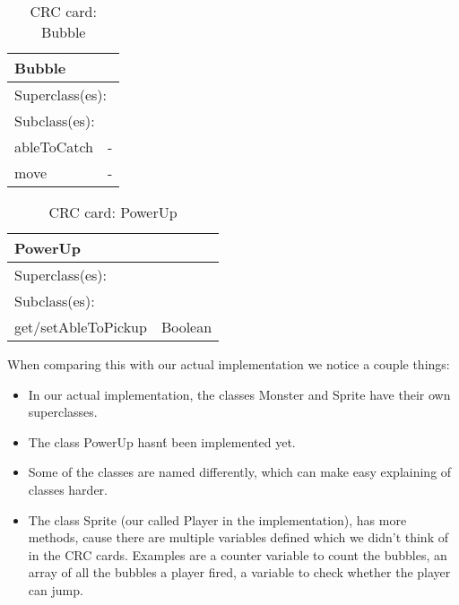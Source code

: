 \begin{table}[]
\centering
\label{crc_bubble}
\begin{tabular}{|l|l|}
\hline
\multicolumn{2}{|l|}{Bubble} \\ \hline
\multicolumn{2}{|l|}{Superclass(es):} \\ \hline
\multicolumn{2}{|l|}{Subclass(es):} \\ \hline
ableToCatch           & - \\ \hline
move           & -\\ \hline
\end{tabular}
\caption{CRC card: Bubble}
\end{table}

\begin{table}[]
\centering
\label{crc_powerup}
\begin{tabular}{|l|l|}
\hline
\multicolumn{2}{|l|}{PowerUp} \\ \hline
\multicolumn{2}{|l|}{Superclass(es):} \\ \hline
\multicolumn{2}{|l|}{Subclass(es):} \\ \hline
get/setAbleToPickup           & Boolean \\ \hline
\end{tabular}
\caption{CRC card: PowerUp}
\end{table}

When comparing this with our actual implementation we notice a couple things:
\begin{itemize}
\item In our actual implementation, the classes Monster and Sprite have their own superclasses.
\item The class PowerUp hasn\'t been implemented yet. 
\item Some of the classes are named differently, which can make easy explaining of classes harder. 
\item The class Sprite (our called Player in the implementation), has more methods, cause there are multiple variables defined which we didn't think of in the CRC cards. Examples are a counter variable to count the bubbles, an array of all the bubbles a player fired, a variable to check whether the player can jump. 
\end{itemize}